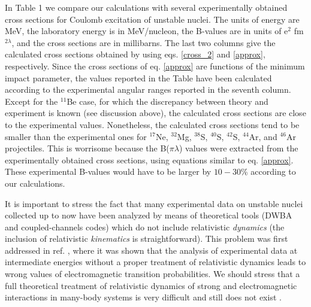 \documentclass[prc,preprint,showpacs,showkeys,nofootinbib]{revtex4}%
\begin{document}
In Table 1 we compare our calculations with several experimentally
obtained cross sections for Coulomb excitation of unstable nuclei.
The units of energy are MeV, the laboratory energy is in
MeV/nucleon, the B-values are in units of e$^{2}$ fm$^{2\lambda}$,
and the cross sections are in millibarns. The last two columns give
the calculated cross sections obtained by using eqs. \ref{cross_2}
and \ref{approx}, respectively. Since the cross sections of  eq.
\ref{approx} are functions of the minimum impact parameter, the
values reported in the Table have been calculated according to the
experimental angular ranges reported in the seventh column. Except
for the $^{11}$Be case, for which the discrepancy between theory and
experiment is known (see discussion above), the calculated cross
sections are close to the experimental values. Nonetheless, the
calculated cross sections tend to be smaller than the experimental
ones for $^{17}$Ne, $^{32}$Mg, $^{38}$S, $^{40}$S, $^{42}$S,
$^{44}$Ar, and $^{46}$Ar projectiles. This is worrisome because the
B($\pi\lambda$) values were extracted from the experimentally
obtained cross sections, using equations similar to eq.
\ref{approx}. These experimental B-values would have to be larger by
$10-30$\% according to our calculations.

It is important to stress the fact that many experimental data on
unstable nuclei collected up to now have been analyzed by means of
theoretical tools (DWBA and coupled-channels codes) which do not
include relativistic {\it dynamics} (the inclusion of relativistic
{\it kinematics} is straightforward). This problem was first
addressed in ref. \cite{Ber05}, where it was shown that the analysis
of experimental data at intermediate energies without a proper
treatment of relativistic dynamics leads to wrong values of
electromagnetic transition probabilities. We should stress that a
full theoretical treatment of relativistic dynamics of strong and
electromagnetic interactions in many-body systems is very difficult
and still does not exist \cite{Ber05}.
\end{document}
